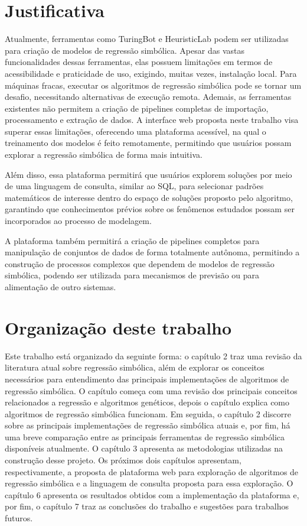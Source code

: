 \section{Justificativa}
Atualmente, ferramentas como TuringBot e HeuristicLab podem ser utilizadas para criação de modelos de regressão simbólica. Apesar das vastas funcionalidades dessas ferramentas, elas possuem limitações em termos de acessibilidade e praticidade de uso, exigindo, muitas vezes, instalação local. Para máquinas fracas, executar os algoritmos de regressão simbólica pode se tornar um desafio, necessitando alternativas de execução remota. Ademais, as ferramentas existentes não permitem a criação de pipelines completas de importação, processamento e extração de dados. A interface web proposta neste trabalho visa superar essas limitações, oferecendo uma plataforma acessível, na qual o treinamento dos modelos é feito remotamente, permitindo que usuários possam explorar a regressão simbólica de forma mais intuitiva.

Além disso, essa plataforma permitirá que usuários explorem soluções por meio de uma linguagem de consulta, similar ao SQL, para selecionar padrões matemáticos de interesse dentro do espaço de soluções proposto pelo algoritmo, garantindo que conhecimentos prévios sobre os fenômenos estudados possam ser incorporados ao processo de modelagem.

A plataforma também permitirá a criação de pipelines completos para manipulação de conjuntos de dados de forma totalmente autônoma, permitindo a construção de processos complexos que dependem de modelos de regressão simbólica, podendo ser utilizada para mecanismos de previsão ou para alimentação de outro sistemas.

\section{Organização deste trabalho}
Este trabalho está organizado da seguinte forma: o capítulo 2 traz uma revisão da literatura atual sobre regressão simbólica, além de explorar os conceitos necessários para entendimento das principais implementações de algoritmos de regressão simbólica. O capítulo começa com uma revisão dos principais conceitos relacionados a regressão e algoritmos genéticos, depois o capítulo explica como algoritmos de regressão simbólica funcionam. Em seguida, o capítulo 2 discorre sobre as principais implementações de regressão simbólica atuais e, por fim, há uma breve comparação entre as principais ferramentas de regressão simbólica disponíveis atualmente. O capítulo 3 apresenta as metodologias utilizadas na construção desse projeto. Os próximos dois capítulos apresentam, respectivamente, a proposta de plataforma web para exploração de algoritmos de regressão simbólica e a linguagem de consulta proposta para essa exploração. O capítulo 6 apresenta os resultados obtidos com a implementação da plataforma e, por fim, o capítulo 7 traz as conclusões do trabalho e sugestões para trabalhos futuros.
